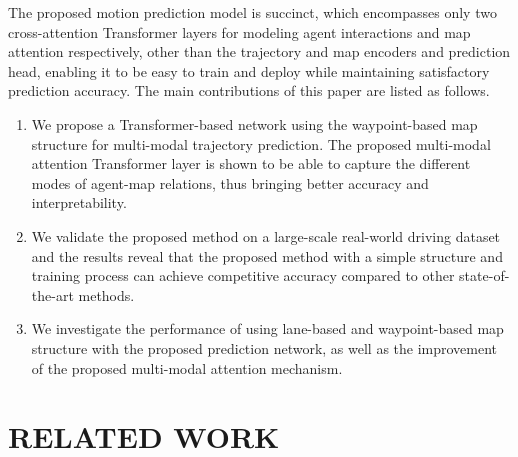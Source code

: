 \documentclass[letterpaper, 10 pt, conference]{ieeeconf}
\begin{document}
The proposed motion prediction model is succinct, which encompasses only two cross-attention Transformer layers for modeling agent interactions and map attention respectively, other than the trajectory and map encoders and prediction head, enabling it to be easy to train and deploy while maintaining satisfactory prediction accuracy. The main contributions of this paper are listed as follows.

\begin{enumerate}
\item We propose a Transformer-based network using the waypoint-based map structure for multi-modal trajectory prediction. The proposed multi-modal attention Transformer layer is shown to be able to capture the different modes of agent-map relations, thus bringing better accuracy and interpretability.

\item We validate the proposed method on a large-scale real-world driving dataset and the results reveal that the proposed method with a simple structure and training process can achieve competitive accuracy compared to other state-of-the-art methods.

\item We investigate the performance of using lane-based and waypoint-based map structure with the proposed prediction network, as well as the improvement of the proposed multi-modal attention mechanism.
\end{enumerate}


\section{RELATED WORK}
\end{document}
